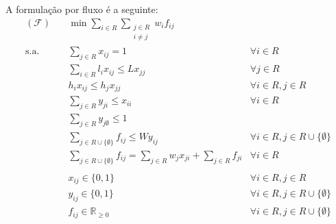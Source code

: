 \documentclass{article}
\begin{document}
A formulação por fluxo é a seguinte:
\begin{align}
    (\mathcal{F})\quad
     & \min \sum_{i \in R} \sum_{\substack{j \in R                                                                                                         \\i \neq j}} w_i f_{ij}\nonumber\\
    \text{s.a.}\quad
     & \sum_{j \in R} x_{ij} = 1                                                                    & \forall i \in R                                      \\
     & \sum_{i \in R} l_{i} x_{ij} \leq L x_{jj}                                                    & \forall j \in R                                      \\
     & h_i x_{ij} \leq h_j x_{jj}                                                                   & \forall i \in R, j \in R                             \\
     & \sum_{j \in R} y_{ji} \leq x_{ii}                                                            & \forall i \in R                                      \\
     & \sum_{j \in R} y_{j\emptyset} \leq 1                                                                                                                \\
     & \sum_{j \in R \cup \{\emptyset\}} f_{ij} \leq W y_{ij}                                       & \forall i \in R, j \in R \cup \{\emptyset\}          \\
     & \sum_{j \in R \cup \{\emptyset\}} f_{ij} = \sum_{j \in R} w_j x_{ji} + \sum_{j \in R} f_{ji} & \forall i \in R                                      \\
    \nonumber                                                                                                                                              \\
     & x_{ij} \in \{0, 1\}                                                                          & \forall i \in R, j \in R\nonumber                    \\
     & y_{ij} \in \{0, 1\}                                                                          & \forall i \in R, j \in R \cup \{\emptyset\}\nonumber \\
     & f_{ij} \in \mathbb{R}_{\geq 0}                                                               & \forall i \in R, j \in R \cup \{\emptyset\}\nonumber \\
\end{align}
\end{document}
